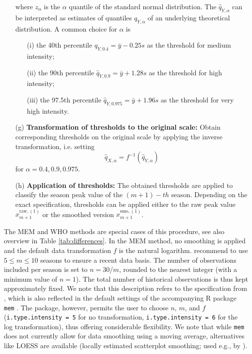 \documentclass{article}
\newcommand{\sd}{s}
\begin{document}
\begin{enumerate}
\begin{equation}
\end{equation}
where $z_\alpha$ is the $\alpha$ quantile of the standard normal distribution. The $\hat{q}_{Y, \alpha}$ can be interpreted as estimates of quantiles $q_{Y, \alpha}$ of an underlying theoretical distribution. A common choice for $\alpha$ is
\begin{itemize}
\item[(i)] the 40th percentile $\hat{q}_{Y, 0.4} = \bar{y} - 0.25 \sd$ as the threshold for medium intensity;
\item[(ii)] the 90th percentile $\hat{q}_{Y, 0.9} = \bar{y} + 1.28 \sd$ as the threshold for high intensity;
\item[(iii)] the 97.5th percentile $\hat{q}_{Y, 0.975} = \bar{y} + 1.96\sd$ as the threshold for very high intensity.
\end{itemize}
\item[(g)] \textbf{Transformation of thresholds to the original scale:} Obtain corresponding thresholds on the original scale by applying the inverse transformation, i.e. setting %
$$
\hat{q}_{X, \alpha} = f^{-1}(\hat{q}_{Y, \alpha})
$$
for $\alpha = 0.4, 0.9, 0.975$.
\item[(h)] \textbf{Application of thresholds:} The obtained thresholds are applied to classify the season peak value of the $(m + 1)-th$ season. Depending on the exact specification, thresholds can be applied either to the raw peak value $x_{m + 1}^{\text{raw}, (1)}$ or the smoothed version $x_{m + 1}^{\text{smo}, (1)}$.
\end{enumerate}

\noindent The MEM and WHO methods are special cases of this procedure, see also overview in Table \ref{tab:differences}. In the MEM method, no smoothing is applied and the default data transformation $f$ is the natural logarithm.  \cite{Vega2015} recommend to use $5 \leq m \leq 10$ seasons to ensure a recent data basis. The number of observations included per season is set to $n = 30/m$, rounded to the nearest integer (with a minimum value of $n = 1$). The total number of historical observations is thus kept approximately fixed. We note that this description refers to the specification from \cite{Vega2015}, which is also reflected in the default settings of the accompanying R package \texttt{mem} \citep{Lozano2020}. The package, however, permits the user to choose $n$, $m$, and $f$ (\texttt{i.type.intensity	= 5} for no transformation, \texttt{i.type.intensity = 6} for the log transformation), thus offering considerable flexibility. We note that while \texttt{mem} does not currently allow for data smoothing using a moving average, alternatives like LOESS are available (locally estimated scatterplot smoothing; used e.g., by \citealt{Wang2023}). %
\end{document}
